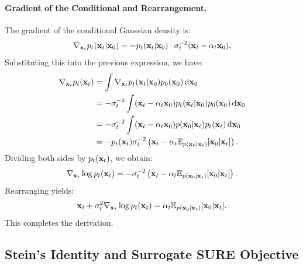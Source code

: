 \paragraph{Gradient of the Conditional and Rearrangement.}
The gradient of the conditional Gaussian density  is:
\begin{align*}
\nabla_{{\mathbf{x}}_t} p_t({\mathbf{x}}_t|{\mathbf{x}}_0) 
= -p_t({\mathbf{x}}_t|{\mathbf{x}}_0) \cdot \sigma_t^{-2} ({\mathbf{x}}_t - \alpha_t {\mathbf{x}}_0).
\end{align*}
Substituting this into the previous expression, we have:
\begin{align*}
\nabla_{{\mathbf{x}}_t} p_t({\mathbf{x}}_t) 
&= \int \nabla_{{\mathbf{x}}_t} p_t({\mathbf{x}}_t|{\mathbf{x}}_0)  p_0({\mathbf{x}}_0)  \mathop{}\!\mathrm{d}{\mathbf{x}}_0 \\
&= -\sigma_t^{-2} \int ({\mathbf{x}}_t - \alpha_t {\mathbf{x}}_0)  p_t({\mathbf{x}}_t|{\mathbf{x}}_0)  p_0({\mathbf{x}}_0)  \mathop{}\!\mathrm{d}{\mathbf{x}}_0 \\
&= -\sigma_t^{-2} \int ({\mathbf{x}}_t - \alpha_t {\mathbf{x}}_0)  p({\mathbf{x}}_0|{\mathbf{x}}_t)  p_t({\mathbf{x}}_t)  \mathop{}\!\mathrm{d}{\mathbf{x}}_0 \\
&= -p_t({\mathbf{x}}_t)  \sigma_t^{-2} \left({\mathbf{x}}_t - \alpha_t  \mathbb{E}_{p({\mathbf{x}}_0|{\mathbf{x}}_t)}[{\mathbf{x}}_0\vert {\mathbf{x}}_t] \right).
\end{align*}
Dividing both sides by $p_t({\mathbf{x}}_t)$, we obtain:
\begin{align*}
\nabla_{{\mathbf{x}}_t} \log p_t({\mathbf{x}}_t) 
= -\sigma_t^{-2} \left({\mathbf{x}}_t - \alpha_t  \mathbb{E}_{p({\mathbf{x}}_0|{\mathbf{x}}_t)}[{\mathbf{x}}_0\vert {\mathbf{x}}_t] \right).
\end{align*}
Rearranging yields:
\begin{align*}
{\mathbf{x}}_t + \sigma_t^{2} \nabla_{{\mathbf{x}}_t} \log p_t({\mathbf{x}}_t) 
= \alpha_t  \mathbb{E}_{p({\mathbf{x}}_0|{\mathbf{x}}_t)}[{\mathbf{x}}_0\vert {\mathbf{x}}_t].
\end{align*}
This completes the derivation.

\subsection{Stein’s Identity and Surrogate SURE Objective}\label{app-sec:stein-identity}

